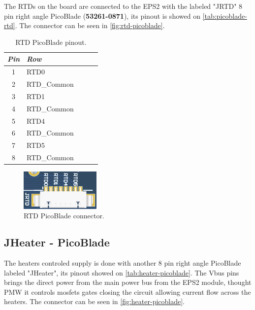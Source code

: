 The RTDs on the board are connected to the EPS2 with the labeled "JRTD" 8 pin right angle PicoBlade (\textbf{53261-0871}), its pinout is showed on \autoref{tab:picoblade-rtd}. The connector can be seen in \autoref{fig:rtd-picoblade}.

\begin{table}[!h]
    \centering
    \begin{tabular}{cllll}
        \toprule[1.5pt]
        \textit{Pin} & \textit{Row} \\
        \midrule
        1            & RTD0         \\
        2            & RTD\_Common  \\
        3            & RTD1     \\
        4            & RTD\_Common  \\
        5            & RTD4         \\
        6            & RTD\_Common  \\
        7            & RTD5         \\
        8            & RTD\_Common  \\
        \bottomrule[1.5pt]
    \end{tabular}
    \caption{RTD PicoBlade pinout.}
    \label{tab:picoblade-rtd}
\end{table}

\begin{figure}[!ht]
    \begin{center}
        \includegraphics[width=0.35\textwidth]{figures/rtd-picoblade.png}
        \caption{RTD PicoBlade connector.}
        \label{fig:rtd-picoblade}
    \end{center}
\end{figure}

\subsection{JHeater - PicoBlade}

The heaters controled supply is done with another 8 pin right angle PicoBlade labeled "JHeater", its pinout showed on \autoref{tab:heater-picoblade}. The Vbus pins brings the direct power from the main power bus from the EPS2 module, thought PMW it controls mosfets gates closing the circuit allowing current flow across the heaters. The connector can be seen in \autoref{fig:heater-picoblade}.

